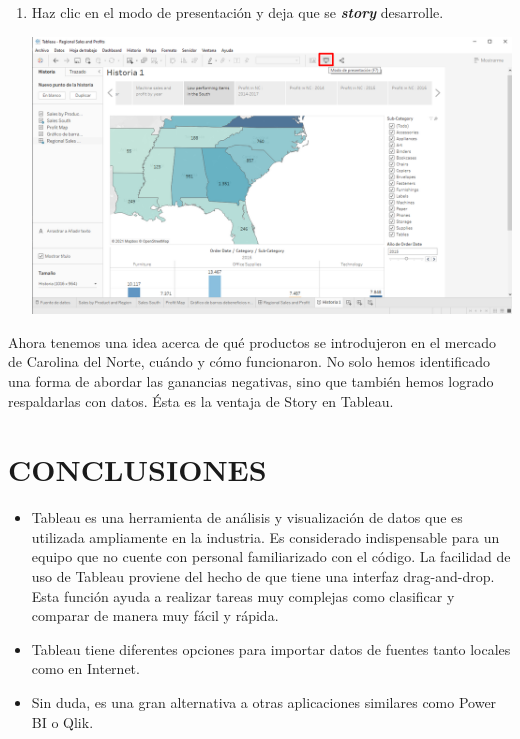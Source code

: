 \documentclass[12pt,letterpaper]{article}
\begin{document}
\begin{enumerate}
\begin{center}
        \end{center}
        \item Haz clic en el modo de presentación y deja que se \textit{\textbf{story}} desarrolle.
        \begin{center}
            \includegraphics[width=15cm]{./img/img101.png}
        \end{center}
    \end{enumerate}
    Ahora tenemos una idea acerca de qué productos se introdujeron en el mercado de Carolina del Norte, cuándo y cómo funcionaron. No solo hemos identificado una forma de abordar las ganancias negativas, sino que también hemos logrado respaldarlas con datos. Ésta es la ventaja de Story en Tableau.
    \newpage
    \section{CONCLUSIONES}
    \begin{itemize}
        \item Tableau es una herramienta de análisis y visualización de datos que es utilizada ampliamente en la industria. Es considerado indispensable para un equipo que no cuente con personal familiarizado con el código. La facilidad de uso de Tableau proviene del hecho de que tiene una interfaz drag-and-drop. Esta función ayuda a realizar tareas muy complejas como clasificar y comparar de manera muy fácil y rápida.
        \item Tableau tiene diferentes opciones para importar datos de fuentes tanto locales como en Internet.
        \item Sin duda, es una gran alternativa a otras aplicaciones similares como Power BI o Qlik.
    \end{itemize}
    \newpage
\end{document}
